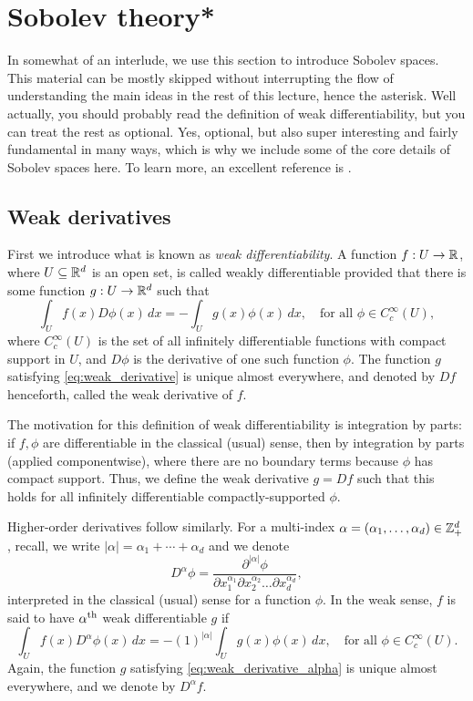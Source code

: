 \documentclass{article}
\begin{document}
\section{Sobolev theory*}

In somewhat of an interlude, we use this section to introduce Sobolev
spaces. This material can be mostly skipped without interrupting the flow of
understanding the main ideas in the rest of this lecture, hence the
asterisk. Well actually, you should probably read the definition of weak 
differentiability, but you can treat the rest as optional. Yes, optional, but
also super interesting and fairly fundamental in many ways, which is why we
include some of the core details of Sobolev spaces here. To learn more, an
excellent reference is \citet{evans2010partial}.  

\subsection{Weak derivatives}

First we introduce what is known as \emph{weak differentiability}. A function $f
: U \to \mathbb{R}$, where $U \subseteq \mathbb{R}^d$ is an open set, is called weakly
differentiable provided that there is some function $g : U \to \mathbb{R}^d$ such that
\begin{equation}
\label{eq:weak_derivative}
\int_U f(x) D \phi(x) \, dx = - \int_U g(x) \phi(x) \, dx,
\quad \text{for all $\phi \in C_c^\infty(U)$}, 
\end{equation}
where $C_c^\infty(U)$ is the set of all infinitely differentiable functions with
compact support in $U$, and $D\phi$ is the derivative of one such function
$\phi$. The function $g$ satisfying \eqref{eq:weak_derivative} is unique almost
everywhere, and denoted by $Df$ henceforth, called the weak derivative of $f$.

The motivation for this definition of weak differentiability is integration by
parts: if $f,\phi$ are differentiable in the classical (usual) sense, then
 by
integration by parts (applied componentwise), where there are no boundary terms
because $\phi$ has compact support. Thus, we define the weak derivative $g = Df$
such that this holds for all infinitely differentiable compactly-supported
$\phi$.

Higher-order derivatives follow similarly. For a multi-index $\alpha =
(\alpha_1,\dots,\alpha_d) \in \mathbb{Z}^d_+$, recall, we write $|\alpha| = \alpha_1 +
\cdots + \alpha_d$ and we denote   
\[
D^\alpha \phi = \frac{\partial^{|\alpha|} \phi}{\partial x_1^{\alpha_1} \partial 
  x_2^{\alpha_2} \dots \partial x_d^{\alpha_d}},
\]
interpreted in the classical (usual) sense for a function $\phi$. In the weak
sense, $f$ is said to have $\alpha^{\text{th}}$ weak differentiable $g$ if 
\begin{equation}
\label{eq:weak_derivative_alpha}
\int_U f(x) D^\alpha \phi(x) \, dx = - (1)^{|\alpha|} \int_U g(x) \phi(x) \, dx,
\quad \text{for all $\phi \in C_c^\infty(U)$}.   
\end{equation}
Again, the function $g$ satisfying \eqref{eq:weak_derivative_alpha} is unique
almost everywhere, and we denote by $D^\alpha f$.
\end{document}
